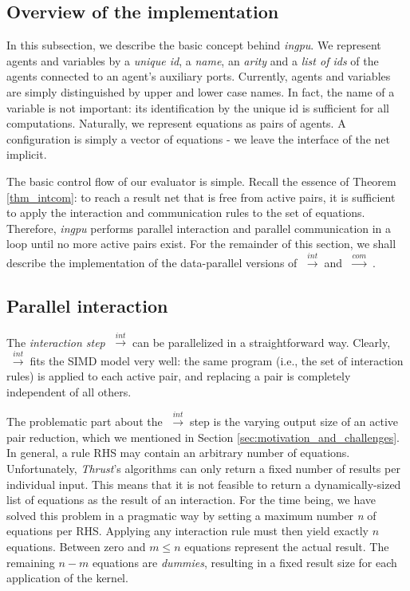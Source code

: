 \documentclass[submission,copyright,creativecommons]{eptcs}
\newcommand{\lwint}{$\;\stackrel{int}{\longrightarrow}\;$}
\newcommand{\lwcom}{$\;\stackrel{com}{\longrightarrow}\;$}
\begin{document}
\subsection{Overview of the implementation}
\label{sec:overview_of_the_implementation}
In this subsection, we describe the basic concept behind \emph{ingpu}.
We represent agents and variables by a
\emph{unique id}, a \emph{name}, an \emph{arity} and a \emph{list of ids} of the agents
connected to an agent's auxiliary ports.
Currently, agents and variables are simply distinguished by upper and lower
case names. In fact, the name of a variable is not important: its identification
by the unique id is sufficient for all computations.
Naturally, we represent equations as pairs of agents. A configuration is simply
a vector of equations - we leave the interface of the net implicit.

The basic control flow of our evaluator is simple. Recall the essence of
Theorem \ref{thm_intcom}: to reach a result net that is free from active pairs,
it is sufficient to apply the interaction and communication rules to the set of
equations. Therefore, \emph{ingpu} performs parallel interaction and parallel
communication in a loop until no more active pairs exist.
For the remainder of this section, we shall describe the implementation of the
data-parallel versions of \lwint and \lwcom.

\subsection{Parallel interaction}

The \emph{interaction step} \lwint can be parallelized in a straightforward
way. Clearly, \lwint fits the SIMD model very well: the same program (i.e., the set
of interaction rules) is applied to each active pair, and replacing a pair is
completely independent of all others.

The problematic part about the \lwint step is the varying output size of an
active pair reduction, which we mentioned in Section
\ref{sec:motivation_and_challenges}.
In general, a rule RHS may contain an arbitrary number of equations.
Unfortunately, \emph{Thrust}'s algorithms can only return a fixed number of
results per individual input.
This means that it is not feasible to return a dynamically-sized list of
equations as the result of an interaction.
For the time being, we have solved this problem in a pragmatic way by
setting a maximum number \emph{n} of equations per RHS.
 Applying
any interaction rule must then yield exactly $n$ equations. Between zero and $m
\leq n$ equations represent the actual result. The remaining $n - m$ equations are
\emph{dummies}, resulting in a fixed result size for each application of the
kernel.
\end{document}
